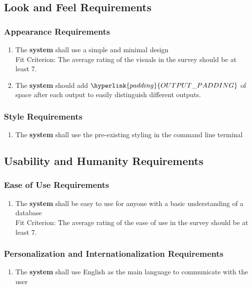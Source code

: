 \documentclass[12pt, titlepage]{article}
\begin{document}
\subsection{Look and Feel Requirements}
    \subsubsection{Appearance Requirements}
        \begin{enumerate}
            \item The \textbf{system} shall use a simple and minimal design\\
            {\color{red}Fit Criterion: The average rating of the visuals in the survey should be at least 7.}
            \item The \textbf{system} should add $\hyperlink{padding}{OUTPUT\_PADDING}$ of space after each output to easily distinguish different outputs.
        \end{enumerate}
    \subsubsection{Style Requirements}
        \begin{enumerate}
            \item The \textbf{system} shall use the pre-existing styling in the command line terminal
        \end{enumerate}
\subsection{Usability and Humanity Requirements}
    \subsubsection{Ease of Use Requirements}
        \begin{enumerate}
            \item The \textbf{system} shall be easy to use for anyone with a basic understanding of a database\\
            {\color{red}Fit Criterion: The average rating of the ease of use in the survey should be at least 7.}
        \end{enumerate}
    \subsubsection{Personalization and Internationalization Requirements}
        \begin{enumerate}
            \item The \textbf{system} shall use English as the main language to communicate with the user
        \end{enumerate}
\end{document}
